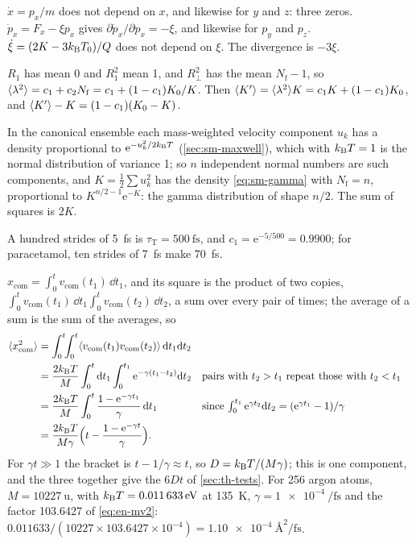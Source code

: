 $\dot x = p_x/m$ does not depend on $x$, and
likewise for $y$ and $z$: three zeros. $\dot p_x = F_x - \xi p_x$ gives
$\partial\dot p_x/\partial p_x = -\xi$, and likewise for $p_y$ and $p_z$.
$\dot\xi = (2K - 3k_{\mathrm{B}} T_0)/Q$ does not depend on $\xi$. The divergence is
$-3\xi$.

$R_1$ has mean 0 and $R_1^2$ mean 1, and $R_\perp^2$
has the mean $N_{\mathrm f} - 1$, so $\langle \lambda^2 \rangle = c_1 + c_2
N_{\mathrm f} = c_1 + (1 - c_1)K_0/K$. Then $\langle K' \rangle = \langle \lambda^2 \rangle K =
c_1K + (1 - c_1)K_0$, and $\langle K' \rangle - K = (1 - c_1)(K_0 - K)$.

In the canonical ensemble each mass-weighted
velocity component $u_k$ has a density proportional to
$\mathrm{e}^{-u_k^2/2k_{\mathrm{B}} T}$ (\cref{sec:sm-maxwell}), which with $k_{\mathrm{B}} T =
1$ is the normal distribution of variance 1; so $n$ independent normal
numbers are such components, and $K = \frac12\sum u_k^2$ has the density
\cref{eq:sm-gamma} with $N_{\mathrm f} = n$, proportional to $K^{n/2 -
1}\mathrm{e}^{-K}$: the gamma distribution of shape $n/2$. The sum of
squares is $2K$.

A hundred strides of \SI{5}{\femto\second} is
$\tau_{\mathrm T} = \SI{500}{\femto\second}$, and $c_1 = \mathrm{e}^{-5/500}
= 0.9900$; for paracetamol, ten strides of \SI{7}{\femto\second} make
\SI{70}{\femto\second}.

$x_{\mathrm{com}} = \int_0^tv_{\mathrm{com}}(t_1)
\,\dd t_1$, and its square is the product of two copies,
$\int_0^tv_{\mathrm{com}}(t_1)\,\dd t_1\int_0^tv_{\mathrm{com}}(t_2)\,\dd
t_2$, a sum over every pair of times; the average of a sum is the sum of
the averages, so
\begin{align*}
   \langle x_{\mathrm{com}}^2 \rangle &= \int_0^t\!\!\int_0^t
   \langle v_{\mathrm{com}}(t_1)v_{\mathrm{com}}(t_2) \rangle\,\mathrm{d} t_1\mathrm{d} t_2\\
   &= \frac{2k_{\mathrm{B}} T}{M}\int_0^t\mathrm{d} t_1\int_0^{t_1}\mathrm{e}^{-\gamma(t_1 -
   t_2)}\mathrm{d} t_2
   && \text{pairs with $t_2 > t_1$ repeat those with $t_2 < t_1$}\\
   &= \frac{2k_{\mathrm{B}} T}{M}\int_0^t\frac{1 - \mathrm{e}^{-\gamma t_1}}{\gamma}
   \,\mathrm{d} t_1
   && \text{since $\textstyle\int_0^{t_1}\mathrm{e}^{\gamma t_2}\mathrm{d} t_2 =
   (\mathrm{e}^{\gamma t_1} - 1)/\gamma$}\\
   &= \frac{2k_{\mathrm{B}} T}{M\gamma}\Bigl(t - \frac{1 - \mathrm{e}^{-\gamma
   t}}{\gamma}\Bigr) .
\end{align*}
For $\gamma t \gg 1$ the bracket is $t - 1/\gamma \approx t$, so $D = k_{\mathrm{B}}
T/(M\gamma)$; this is one component, and the three together give the $6Dt$
of \cref{sec:th-tests}. For 256 argon atoms, $M = \SI{10227}{\amu}$, with
$k_{\mathrm{B}} T = \SI{0.011633}{\electronvolt}$ at \SI{135}{\kelvin}, $\gamma =
\SI{1e-4}{\per\femto\second}$ and the factor 103.6427 of \cref{eq:en-mv2}:
$0.011633/(10227\times103.6427\times10^{-4}) =
\SI{1.10e-4}{\angstrom\squared\per\femto\second}$.


